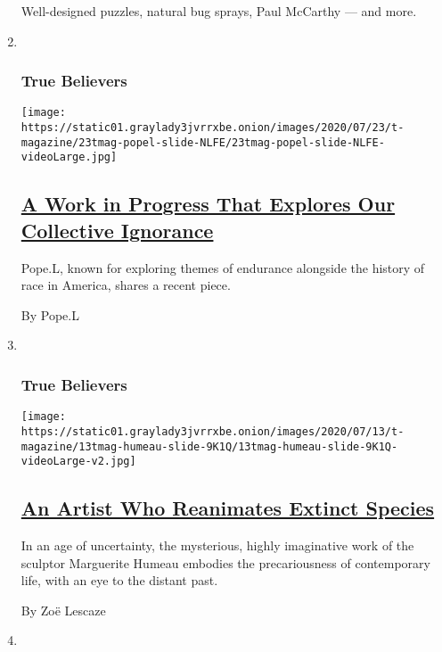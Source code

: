 \begin{enumerate}
  Well-designed puzzles, natural bug sprays, Paul McCarthy --- and more.
\item ~
  \hypertarget{true-believers-5}{%
  \subsubsection{True Believers}\label{true-believers-5}}

  \texttt{[image: https://static01.graylady3jvrrxbe.onion/images/2020/07/23/t-magazine/23tmag-popel-slide-NLFE/23tmag-popel-slide-NLFE-videoLarge.jpg]}

  \hypertarget{a-work-in-progress-that-explores-our-collective-ignorance}{%
  \subsection{\texorpdfstring{\href{/2020/07/23/t-magazine/pope-l-i-machine.html}{A
  Work in Progress That Explores Our Collective
  Ignorance}}{A Work in Progress That Explores Our Collective Ignorance}}\label{a-work-in-progress-that-explores-our-collective-ignorance}}

  Pope.L, known for exploring themes of endurance alongside the history
  of race in America, shares a recent piece.

  By Pope.L
\item ~
  \hypertarget{true-believers-6}{%
  \subsubsection{True Believers}\label{true-believers-6}}

  \texttt{[image: https://static01.graylady3jvrrxbe.onion/images/2020/07/13/t-magazine/13tmag-humeau-slide-9K1Q/13tmag-humeau-slide-9K1Q-videoLarge-v2.jpg]}

  \hypertarget{an-artist-who-reanimates-extinct-species}{%
  \subsection{\texorpdfstring{\href{/2020/07/23/t-magazine/marguerite-humeau.html}{An
  Artist Who Reanimates Extinct
  Species}}{An Artist Who Reanimates Extinct Species}}\label{an-artist-who-reanimates-extinct-species}}

  In an age of uncertainty, the mysterious, highly imaginative work of
  the sculptor Marguerite Humeau embodies the precariousness of
  contemporary life, with an eye to the distant past.

  By Zoë Lescaze
\item ~
  \hypertarget{true-believers-7}{%
}
\end{enumerate}
